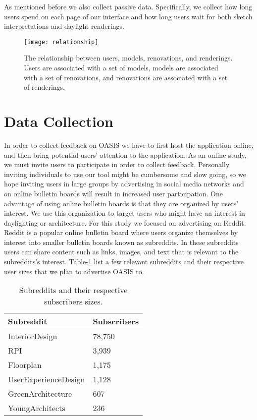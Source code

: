 				
	As mentioned before we also collect passive data.
	Specifically, we collect how long users spend on each page of our interface and how long users wait for both  sketch interpretations and daylight renderings.

	\begin{figure}[h]
	\texttt{[image: relationship]}
	\caption[The relationship between users, models, renovations, and renderings.]{The relationship between users, models, renovations, and renderings. Users are associated with a set of models, models are associated with a set of renovations, and renovations are associated with a set of renderings.}
	\label{fig:rel}
	\end{figure}


\section{Data Collection}
	In order to collect feedback on OASIS we have to first host the application online, and then bring potential users' attention to the application. As an online study, we must invite users to participate in order to collect feedback.
	Personally inviting individuals to use our tool might be cumbersome and slow going, so we hope inviting users in large groups by advertising in social media networks and on online bulletin boards will result in increased user participation. One advantage of using online bulletin boards is that they are organized by users' interest.  We use this organization to target users who might have an interest in daylighting or architecture. For this study we focused on advertising on  Reddit\cite{todo}. Reddit is a popular online bulletin board where users organize themselves by interest into smaller bulletin boards known as subreddits. In these subreddits users can share content such as links, images, and text that is relevant to the subreddits's interest. Table-\ref{fig:reddit} list a few relevant subreddits and their respective user sizes that we plan to advertise OASIS to.
	

	\begin{table}[ht!]
	\centering
	    \begin{tabular}{ | l | l | }
	        \hline
		    Subreddit               & Subscribers  \\ \hline
		    InteriorDesign 			& 78,750        \\ \hline
		    RPI 			        & 3,939         \\ \hline
		    Floorplan    			& 1,175         \\ \hline
		    UserExperienceDesign    & 1,128         \\ \hline
		    GreenArchitecture 		& 607          \\ \hline
		    YoungArchitects 		& 236          \\ \hline
	    \end{tabular}
	    \caption{Subreddits and their respective subscribers sizes.}
	    \label{fig:reddit}
	\end{table}

